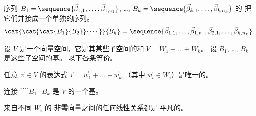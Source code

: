 
\begin{definition}
序列
$
   B_1=\sequence{\vec{\beta}_{1,1},\dots,\vec{\beta}_{1,n_1}}$,
  \ldots,
  $B_k=\sequence{\vec{\beta}_{k,1},\dots,\vec{\beta}_{k,n_k}}$
的%
把它们并接成一个单独的序列。
\begin{equation*}
 \cat{\cat{\cat{B_1}{B_2}}{\cdots}}{B_k}=
   \sequence{\vec{\beta}_{1,1},\dots,\vec{\beta}_{1,n_1},
            \vec{\beta}_{2,1},\dots,\vec{\beta}_{k,n_k} }
\end{equation*}
\end{definition}

\begin{lemma} \label{le:UniqDecIffBasisDec}
设 $V$ 是一个向量空间，它是其某些子空间的和
$V=W_1+\dots+W_k$。
设 $B_1$, \ldots, $B_k$ 是这些子空间的基。
以下各条等价。
\begin{tfae}
  \item 任意 $\vec{v}\in V$ 的表达式
     $\vec{v}=\vec{w}_1+\dots+\vec{w}_k$
     （其中 $\vec{w}_i\in W_i$）是唯一的。
  \item 连接 $\cat{\cat{B_1}{\cdots}}{B_k}$ 是 $V$ 的一个基。
  \item 来自不同 $W_i$ 的
    非零向量之间的任何线性关系都是
    平凡的。
\end{tfae}
\end{lemma}

